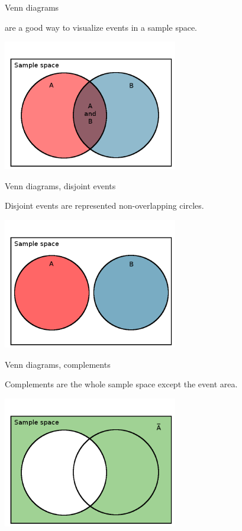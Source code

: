 \documentclass[xcolor=table, aspectratio=169, bigger]{beamer}
\begin{document}
\begin{frame}{Venn diagrams}
\begin{block}{}
\large {} are a good way to visualize events in a sample space.
\end{block}
{\centering
\includegraphics[width=3in]{../images/ch4_venn_ovr}\par
}
\end{frame}

\begin{frame}{Venn diagrams, disjoint events}
\begin{block}{}
\large Disjoint events are represented non-overlapping circles.
\end{block}
{\centering
\includegraphics[width=3in]{../images/ch4_venn_dsj}\par
}
\end{frame}

\begin{frame}{Venn diagrams, complements}
\begin{block}{}
\large Complements are the whole sample space except the event area.
\end{block}
{\centering
\includegraphics[width=3in]{../images/ch4_venn_a_comp}\par
}
\end{frame}
\end{document}
